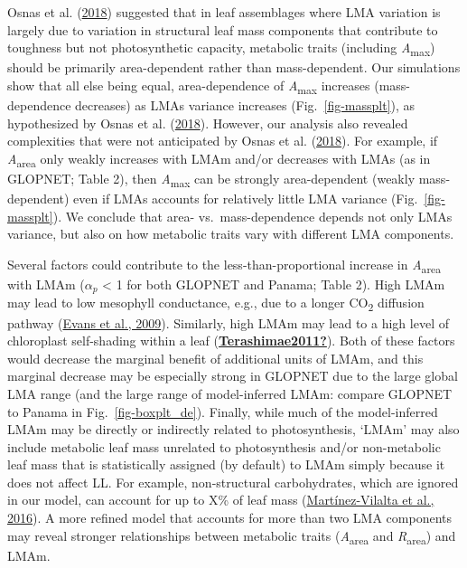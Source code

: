 \documentclass[
  12pt,
  a4paper,
,tablecaptionabove
]{scrartcl}
\begin{document}
Osnas et al. (\protect\hyperlink{ref-Osnas2018}{2018}) suggested that in
leaf assemblages where LMA variation is largely due to variation in
structural leaf mass components that contribute to toughness but not
photosynthetic capacity, metabolic traits (including
\emph{A}\textsubscript{max}) should be primarily area-dependent rather
than mass-dependent. Our simulations show that all else being equal,
area-dependence of \emph{A}\textsubscript{max} increases
(mass-dependence decreases) as LMAs variance increases
(Fig.~\ref{fig-massplt}), as hypothesized by Osnas et al.
(\protect\hyperlink{ref-Osnas2018}{2018}). However, our analysis also
revealed complexities that were not anticipated by Osnas et al.
(\protect\hyperlink{ref-Osnas2018}{2018}). For example, if
\emph{A}\textsubscript{area} only weakly increases with LMAm and/or
decreases with LMAs (as in GLOPNET; Table 2), then
\emph{A}\textsubscript{max} can be strongly area-dependent (weakly
mass-dependent) even if LMAs accounts for relatively little LMA variance
(Fig.~\ref{fig-massplt}). We conclude that area- vs.~mass-dependence
depends not only LMAs variance, but also on how metabolic traits vary
with different LMA components.

Several factors could contribute to the less-than-proportional increase
in \emph{A}\textsubscript{area} with LMAm (\(\alpha_p\) \textless{} 1
for both GLOPNET and Panama; Table 2). High LMAm may lead to low
mesophyll conductance, e.g., due to a longer CO\textsubscript{2}
diffusion pathway (\protect\hyperlink{ref-Evans2009}{Evans et al.,
2009}). Similarly, high LMAm may lead to a high level of chloroplast
self-shading within a leaf
(\protect\hyperlink{ref-Terashimae2011}{\textbf{Terashimae2011?}}). Both
of these factors would decrease the marginal benefit of additional units
of LMAm, and this marginal decrease may be especially strong in GLOPNET
due to the large global LMA range (and the large range of model-inferred
LMAm: compare GLOPNET to Panama in Fig.~\ref{fig-boxplt_de}). Finally,
while much of the model-inferred LMAm may be directly or indirectly
related to photosynthesis, `LMAm' may also include metabolic leaf mass
unrelated to photosynthesis and/or non-metabolic leaf mass that is
statistically assigned (by default) to LMAm simply because it does not
affect LL. For example, non-structural carbohydrates, which are ignored
in our model, can account for up to X\% of leaf mass
(\protect\hyperlink{ref-Martinez-Vilalta2016}{Martínez-Vilalta et al.,
2016}). A more refined model that accounts for more than two LMA
components may reveal stronger relationships between metabolic traits
(\emph{A}\textsubscript{area} and \emph{R}\textsubscript{area}) and
LMAm.
\end{document}
